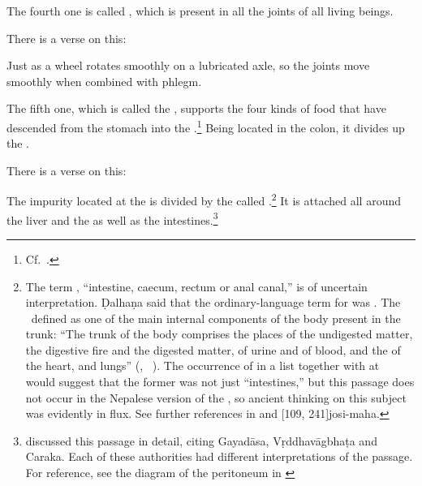 \begin{translation}
\item[14]

The fourth one is called  , which is present 
in all the joints of all living beings.

 

\item[15]

There is a verse on this:

\begin{sloka}
Just as a wheel rotates smoothly on a lubricated axle, so the joints
move smoothly when combined with phlegm. 
\end{sloka} 
 
 
\item[16]

The fifth one, which is called the ,
supports the four kinds  of food that have descended from the stomach
into the .\footnote{Cf.\ \cite[177]{das-2003}.}
    Being located in the colon, it divides up the .
 
 
 
 \item[17]
 
 There is a verse on this:
 \begin{sloka}     
      The impurity located at the  is
divided by the  called
.\footnote{ \label{uṇḍuka}The
    term , “intestine, caecum, rectum or anal canal,” is
    of uncertain interpretation. Ḍalhaṇa said that the
    ordinary-language term for  was . The
    \SS\ defined  as one of the main internal components
    of the body present in the trunk: “The trunk of the body
    comprises the places of the undigested matter, the digestive
    fire and the digested matter, of urine and of blood, and the of
    the heart,  and lungs”
    (, \SS\
    ).   The occurrence of  in a
    list together with \dev{antrāṇi} at \SS\ \Su{3.5.5}{364} would
    suggest that the former was not just “intestines,” but this
    passage does not occur in the Nepalese version of the \SS, so
    ancient thinking on this subject was evidently in flux. See
    further references in \cite[177--178]{das-2003} and
    [109, 241]{josi-maha}.} It is attached all around the
    liver and the \se{koṣṭha}{abdominal cavity} as well as the
    intestines.\footnote{ discussed this
        passage in detail, citing Gayadāsa, Vṛddhavāgbhaṭa and Caraka.
        Each of these authorities had different interpretations of the
        passage.  For reference, see the diagram of the peritoneum in
        \cite[fig.\,3]{isaz-2018}}
\end{sloka}
 

\end{translation}
